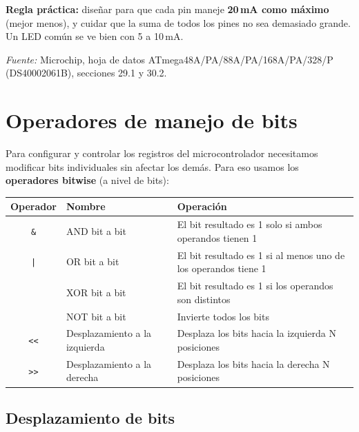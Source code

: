 \begin{importantebox}
\textbf{Regla práctica:} diseñar para que cada pin maneje \textbf{20\,mA como máximo}
(mejor menos), y cuidar que la suma de todos los pines no sea demasiado grande. Un LED
común se ve bien con 5 a 10\,mA.

\emph{Fuente:} Microchip, hoja de datos ATmega48A/PA/88A/PA/168A/PA/328/P
(DS40002061B), secciones 29.1 y 30.2.
\end{importantebox}

\section{Operadores de manejo de bits}

Para configurar y controlar los registros del microcontrolador necesitamos
modificar bits individuales sin afectar los demás. Para eso usamos los
\textbf{operadores bitwise} (a nivel de bits):

\begin{table}[H]
\centering
\begin{tabularx}{\textwidth}{cl>{\raggedright\arraybackslash}X}
\toprule
\textbf{Operador} & \textbf{Nombre} & \textbf{Operación} \\
\midrule
\texttt{\&}  & AND bit a bit                    & El bit resultado es 1 solo si ambos operandos tienen 1 \\
\texttt{|}   & OR bit a bit                     & El bit resultado es 1 si al menos uno de los operandos tiene 1 \\
\texttt{\char94}  & XOR bit a bit                & El bit resultado es 1 si los operandos son distintos \\
\texttt{\char126} & NOT bit a bit                & Invierte todos los bits \\
\texttt{<{}<}    & Desplazamiento a la izquierda & Desplaza los bits hacia la izquierda N posiciones \\
\texttt{>{}>}    & Desplazamiento a la derecha  & Desplaza los bits hacia la derecha N posiciones \\
\bottomrule
\end{tabularx}
\end{table}

\subsection{Desplazamiento de bits}

